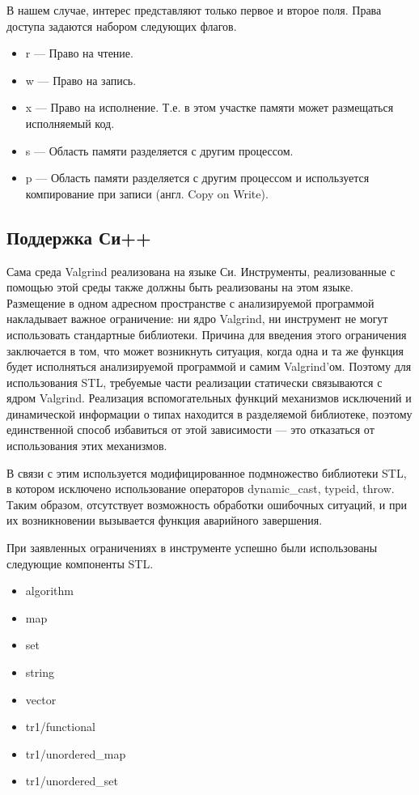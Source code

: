 \documentclass[a4paper,12pt,russian]{article}
\newcommand{\code}[1]{\textsf{#1}}
\begin{document}
В нашем случае, интерес представляют только первое и второе поля.
Права доступа задаются набором следующих флагов.
\begin{itemize}
    \item \code{r} --- Право на чтение.
    \item \code{w} --- Право на запись.
    \item \code{x} --- Право на исполнение. Т.е. в этом участке памяти может размещаться исполняемый код.
    \item \code{s} --- Область памяти разделяется с другим процессом.
    \item \code{p} --- Область памяти разделяется с другим процессом и используется компирование при записи (англ. Copy on Write).
\end{itemize}

\subsection{Поддержка Си++}
Сама среда \code{Valgrind} реализована на языке Си. Инструменты, реализованные с помощью этой среды также должны быть реализованы на этом языке.
Размещение в одном адресном пространстве с анализируемой программой накладывает важное ограничение: ни ядро \code{Valgrind}, ни инструмент не могут использовать стандартные библиотеки.
Причина для введения этого ограничения заключается в том, что может возникнуть ситуация, когда одна и та же функция будет исполняться анализируемой программой и самим \code{Valgrind}'ом.
Поэтому для использования \code{STL}, требуемые части реализации статически связываются с ядром \code{Valgrind}.
Реализация вспомогательных функций механизмов исключений и динамической информации о типах находится в разделяемой библиотеке, поэтому единственной способ избавиться от этой зависимости --- это отказаться от использования этих механизмов.

В связи с этим используется модифицированное подмножество библиотеки \code{STL}, в котором исключено использование операторов \code{dynamic\_cast}, \code{typeid}, \code{throw}. Таким образом, отсутствует возможность обработки ошибочных ситуаций, и при их возникновении вызывается функция аварийного завершения.

При заявленных ограничениях в инструменте успешно были использованы следующие компоненты \code{STL}.
\begin{itemize}
    \item \code{algorithm}
    \item \code{map}
    \item \code{set}
    \item \code{string}
    \item \code{vector}
    \item \code{tr1/functional}
    \item \code{tr1/unordered\_map}
    \item \code{tr1/unordered\_set}
\end{itemize}
\end{document}
